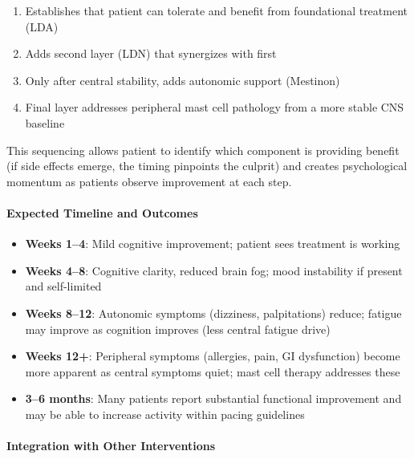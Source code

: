 \begin{protocol}
\begin{enumerate}
    \item Establishes that patient can tolerate and benefit from foundational treatment (LDA)
    \item Adds second layer (LDN) that synergizes with first
    \item Only after central stability, adds autonomic support (Mestinon)
    \item Final layer addresses peripheral mast cell pathology from a more stable CNS baseline
\end{enumerate}

This sequencing allows patient to identify which component is providing benefit (if side effects emerge, the timing pinpoints the culprit) and creates psychological momentum as patients observe improvement at each step.

\paragraph{Expected Timeline and Outcomes}

\begin{itemize}
    \item \textbf{Weeks 1--4}: Mild cognitive improvement; patient sees treatment is working
    \item \textbf{Weeks 4--8}: Cognitive clarity, reduced brain fog; mood instability if present and self-limited
    \item \textbf{Weeks 8--12}: Autonomic symptoms (dizziness, palpitations) reduce; fatigue may improve as cognition improves (less central fatigue drive)
    \item \textbf{Weeks 12+}: Peripheral symptoms (allergies, pain, GI dysfunction) become more apparent as central symptoms quiet; mast cell therapy addresses these
    \item \textbf{3--6 months}: Many patients report substantial functional improvement and may be able to increase activity within pacing guidelines
\end{itemize}

\paragraph{Integration with Other Interventions}


\end{protocol}
